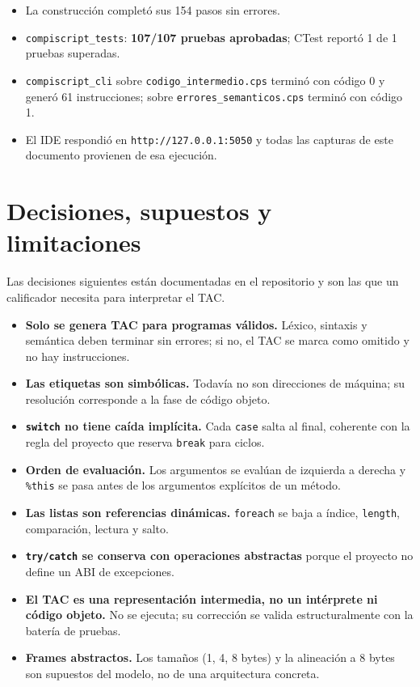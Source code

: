 \documentclass[11pt,a4paper]{article}
\begin{document}
\begin{itemize}[leftmargin=1.4em]
  \item La construcción completó sus 154 pasos sin errores.
  \item \texttt{compiscript\_tests}: \textbf{107/107 pruebas aprobadas}; CTest
        reportó 1 de 1 pruebas superadas.
  \item \texttt{compiscript\_cli} sobre \texttt{codigo\_intermedio.cps} terminó
        con código 0 y generó 61 instrucciones; sobre
        \texttt{errores\_semanticos.cps} terminó con código 1.
  \item El IDE respondió en \texttt{http://127.0.0.1:5050} y todas las capturas
        de este documento provienen de esa ejecución.
\end{itemize}

\section{Decisiones, supuestos y limitaciones}

Las decisiones siguientes están documentadas en el repositorio y son las que un
calificador necesita para interpretar el TAC.

\begin{itemize}[leftmargin=1.4em]
  \item \textbf{Solo se genera TAC para programas válidos.} Léxico, sintaxis y
        semántica deben terminar sin errores; si no, el TAC se marca como
        omitido y no hay instrucciones.
  \item \textbf{Las etiquetas son simbólicas.} Todavía no son direcciones de
        máquina; su resolución corresponde a la fase de código objeto.
  \item \textbf{\texttt{switch} no tiene caída implícita.} Cada \texttt{case}
        salta al final, coherente con la regla del proyecto que reserva
        \texttt{break} para ciclos.
  \item \textbf{Orden de evaluación.} Los argumentos se evalúan de izquierda a
        derecha y \texttt{\%this} se pasa antes de los argumentos explícitos de
        un método.
  \item \textbf{Las listas son referencias dinámicas.} \texttt{foreach} se baja a
        índice, \texttt{length}, comparación, lectura y salto.
  \item \textbf{\texttt{try/catch} se conserva con operaciones abstractas}
        porque el proyecto no define un ABI de excepciones.
  \item \textbf{El TAC es una representación intermedia, no un intérprete ni
        código objeto.} No se ejecuta; su corrección se valida estructuralmente
        con la batería de pruebas.
  \item \textbf{Frames abstractos.} Los tamaños (1, 4, 8 bytes) y la alineación
        a 8 bytes son supuestos del modelo, no de una arquitectura concreta.
\end{itemize}
\end{document}
